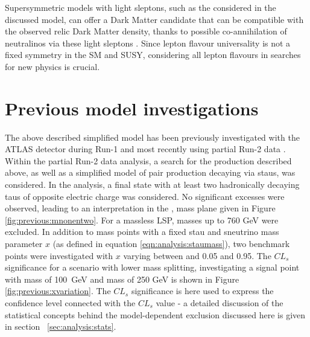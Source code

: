 Supersymmetric models with light sleptons,  such as the \stau considered in the discussed model,  can offer a Dark Matter candidate that can be compatible with the observed relic Dark Matter density,  thanks to possible co-annihilation of neutralinos via these light sleptons \cite{Coannihilation}. 
Since lepton flavour universality is not a fixed symmetry in the \ac{SM} and \ac{SUSY},  considering all lepton flavours in searches for new physics is crucial.
%



\section{Previous model investigations}
\label{sec:analysis:previous}
The above described simplified model has been previously investigated with the \ac{ATLAS} detector during Run-1 \cite{Run1analysis,Run1combination} and most recently using partial Run-2 data \cite{DiTauC1N2_2018}. 
Within the partial Run-2 data analysis, a search for the \Cone \Ntwo production described above,  as well as a simplified model of \Cone pair production decaying via staus,  was considered. 
In the analysis,  a final state with at least two hadronically decaying taus of opposite electric charge was considered. 
No significant excesses were observed,  leading to an interpretation in the \Ntwo, \None mass plane given in Figure \ref{fig:previous:mnonentwo}.  For a massless \ac{LSP},  \Ntwo masses up to 760 GeV were excluded. 
In addition to mass points with a fixed stau and sneutrino mass parameter $x$ (as defined in equation \eqref{eqn:analysis:staumass}),  two benchmark points were investigated with $x$ varying between and 0.05 and 0.95.  The $CL_s$ significance for a scenario with lower mass splitting,  investigating a signal point with \None mass of 100~GeV and \Ntwo mass of 250 GeV is shown in Figure \ref{fig:previous:xvariation}.  The $CL_s$ significance is here used to express the confidence level connected with the $CL_s$ value - a detailed discussion of the statistical concepts behind the model-dependent exclusion discussed here is given in section~ \ref{sec:analysis:stats}.


